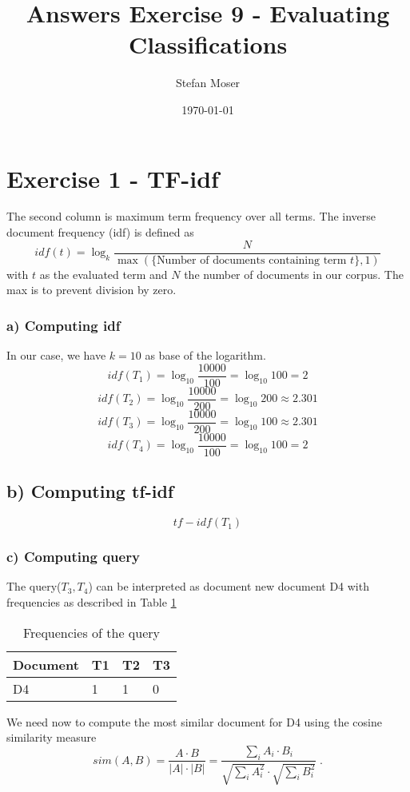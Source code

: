 \documentclass[11pt]{article}
\title{\textbf{Answers Exercise 9 - Evaluating Classifications}}
\author{Stefan Moser}
\date{\today}
\begin{document}
\maketitle

\section*{Exercise 1 - TF-idf}
The second column is maximum term frequency over all terms.
The inverse document frequency (idf) is defined as
\begin{equation}
	idf(t) = \log_k \frac{N}{  \max(\{\text{Number of documents containing term } t \}, 1) }
\end{equation}
with $t$ as the evaluated term and $N$ the number of documents in our corpus. The max is
to prevent division by zero.
\subsubsection*{a) Computing idf}
In our case, we have $k=10$ as base of the logarithm.
\begin{equation}
	idf(T_1) = \log_{10} \frac{10000}{100} = \log_{10} 100 = 2
\end{equation}
\begin{equation}
	idf(T_2) = \log_{10} \frac{10000}{200} = \log_{10} 200 \approx 2.301
\end{equation}
\begin{equation}
	idf(T_3) = \log_{10} \frac{10000}{200} = \log_{10} 100 \approx 2.301
\end{equation}
\begin{equation}
	idf(T_4) = \log_{10} \frac{10000}{100} = \log_{10} 100 = 2
\end{equation}
\subsection*{b) Computing tf-idf}
\begin{equation}
	tf-idf(T_1)
\end{equation}
\subsubsection*{c) Computing query}
The query($T_3, T_4$) can be interpreted as document new document D4 with frequencies
as described in Table \ref{D4}
\begin{table}[h]
\center
\begin{tabular}{l|lll}
	Document & T1 & T2 & T3\\ \hline
	D4 & 1 & 1 & 0\\
\end{tabular}
\caption{Frequencies of the query}
\label{D4}
\end{table}
We need now to compute the most similar document for D4 using the cosine similarity measure
\begin{equation}
	sim(A,B) = \frac{A \cdot B}{|A| \cdot |B|} = \frac{\sum_i A_i \cdot B_i}{\sqrt{\sum_i A_i^2} \cdot \sqrt{\sum_i B_i^2}} \; . 
\end{equation}
\end{document}
